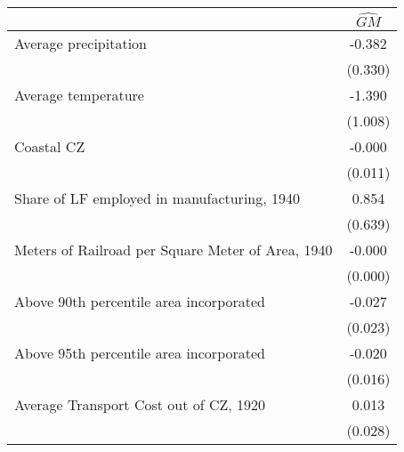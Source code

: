  \begin{tabular}{l*{1}{c}} \toprule
                &\multicolumn{1}{c}{$\widehat{GM}$}\\
\midrule
Average precipitation&   -0.382   \\
                &  (0.330)   \\
\addlinespace
Average temperature&   -1.390   \\
                &  (1.008)   \\
\addlinespace
Coastal CZ      &   -0.000   \\
                &  (0.011)   \\
\addlinespace
Share of LF employed in manufacturing, 1940&    0.854   \\
                &  (0.639)   \\
\addlinespace
Meters of Railroad per Square Meter of Area, 1940&   -0.000   \\
                &  (0.000)   \\
\addlinespace
Above 90th percentile area incorporated&   -0.027   \\
                &  (0.023)   \\
\addlinespace
Above 95th percentile area incorporated&   -0.020   \\
                &  (0.016)   \\
\addlinespace
Average Transport Cost out of CZ, 1920&    0.013   \\
                &  (0.028)   \\
 \bottomrule \end{tabular}
